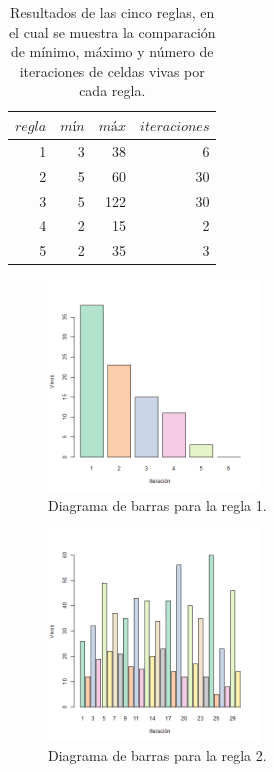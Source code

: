 \documentclass[12pt]{amsart}
\begin{document}
{
\begin{table}[ht]
    \caption{Resultados de las cinco reglas, en el cual se muestra la comparación de mínimo, máximo y número de iteraciones de celdas vivas por cada regla.}
    \label{datos}
    \centering
    \begin{tabular}{|r|r|r|r|}
       \hline
        $regla$&$mín$&$máx$&$iteraciones$ \\
        \hline
        1 & 3 & 38 & 6 \\
        2 & 5 & 60 & 30 \\
        3 & 5 & 122 & 30 \\
        4 & 2 & 15 & 2 \\
        5 & 2 & 35 & 3 \\
        \hline
    \end{tabular}
\end{table}
\bigskip

\begin{figure}[h!]
    \centering
    \includegraphics[width=0.5\textwidth]{regla1.png}
    \caption{\label{fig1} Diagrama de barras para la regla 1.}
    \label{fig:figura1}
\end{figure}

\begin{figure}[h!]
    \centering
    \includegraphics[width=0.5\textwidth]{regla2.png}
    \caption{\label{fig2} Diagrama de barras para la regla 2.}
    \label{fig:figura2}
\end{figure}
\bigskip
\bigskip
\bigskip

}
\end{document}
